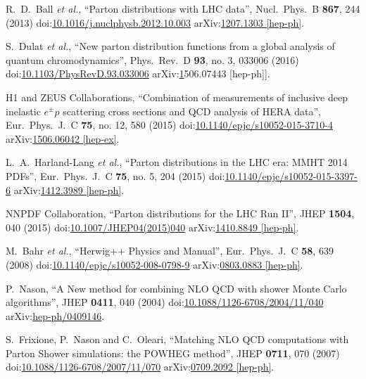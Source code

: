\begin{thebibliography}{99}
R.~D.~Ball {\it et al.}, ``Parton distributions with LHC data'', Nucl.\ Phys.\ B {\bf 867}, 244 (2013) doi:\href{http://dx.doi.org/10.1016/j.nuclphysb.2012.10.003}{10.1016/j.nuclphysb.2012.10.003} arXiv:\href{https://arxiv.org/abs/1207.1303}{1207.1303 [hep-ph]}.

S.~Dulat {\it et al.}, ``New parton distribution functions from a global analysis of quantum chromodynamics'', Phys.\ Rev.\ D {\bf 93}, no. 3, 033006 (2016) doi:\href{http://dx.doi.org/10.1103/PhysRevD.93.033006}{10.1103/PhysRevD.93.033006} arXiv:\href{https://arxiv.org/abs/1506.07443}1506.07443 [hep-ph]].

H1 and ZEUS Collaborations, ``Combination of measurements of inclusive deep inelastic ${e^{\pm }p}$ scattering cross sections and QCD analysis of HERA data'', Eur.\ Phys.\ J.\ C {\bf 75}, no. 12, 580 (2015) doi:\href{http://dx.doi.org/10.1140/epjc/s10052-015-3710-4}{10.1140/epjc/s10052-015-3710-4} arXiv:\href{https://arxiv.org/abs/1506.06042}{1506.06042 [hep-ex]}.

L.~A.~Harland-Lang {\it et al.}, ``Parton distributions in the LHC era: MMHT 2014 PDFs'', Eur.\ Phys.\ J.\ C {\bf 75}, no. 5, 204 (2015) doi:\href{http://dx.doi.org/10.1140/epjc/s10052-015-3397-6}{10.1140/epjc/s10052-015-3397-6} arXiv:\href{https://arxiv.org/abs/1412.3989}{1412.3989 [hep-ph]}.

NNPDF Collaboration, ``Parton distributions for the LHC Run II'', JHEP {\bf 1504}, 040 (2015) doi:\href{http://dx.doi.org/10.1007/JHEP04(2015)040}{10.1007/JHEP04(2015)040} arXiv:\href{https://arxiv.org/abs/1410.8849}{1410.8849 [hep-ph]}.
  
M.~Bahr {\it et al.}, ``Herwig++ Physics and Manual'', Eur.\ Phys.\ J.\ C {\bf 58}, 639 (2008) doi:\href{http://dx.doi.org/10.1140/epjc/s10052-008-0798-9}{10.1140/epjc/s10052-008-0798-9} arXiv:\href{https://arxiv.org/abs/0803.0883}{0803.0883 [hep-ph]}.  

P.~Nason, ``A New method for combining NLO QCD with shower Monte Carlo algorithms'', JHEP {\bf 0411}, 040 (2004) doi:\href{http://dx.doi.org/10.1088/1126-6708/2004/11/040}{10.1088/1126-6708/2004/11/040} arXiv:\href{https://arxiv.org/abs/hep-ph/0409146}{hep-ph/0409146}.
  
S.~Frixione, P.~Nason and C.~Oleari, ``Matching NLO QCD computations with Parton Shower simulations: the POWHEG method'', JHEP {\bf 0711}, 070 (2007) doi:\href{http://dx.doi.org/10.1088/1126-6708/2007/11/070}{10.1088/1126-6708/2007/11/070} arXiv:\href{https://arxiv.org/abs/0709.2092}{0709.2092 [hep-ph]}.  


\end{thebibliography}
